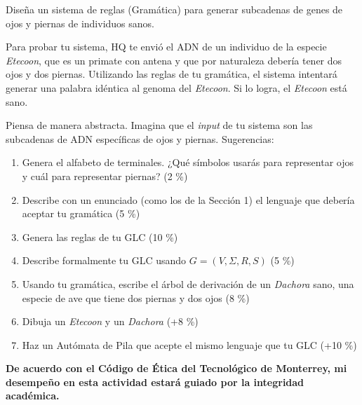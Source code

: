 \documentclass[8pt, onside]{article}
\begin{document}
Diseña un sistema de reglas (Gramática) para generar subcadenas de genes de ojos y piernas de individuos sanos.

Para probar tu sistema, HQ te envió el ADN de un individuo de la especie \textit{Etecoon}, que es un primate con antena y que por naturaleza debería tener dos ojos y dos piernas.
Utilizando las reglas de tu gramática, el sistema intentará generar una palabra idéntica al genoma del \textit{Etecoon}.
Si lo logra, el \textit{Etecoon} está sano.

Piensa de manera abstracta.
Imagina que el \textit{input} de tu sistema son las subcadenas de ADN específicas de ojos y piernas. Sugerencias:

\begin{enumerate}[label=\tt \alph*)]
    \item Genera el alfabeto de terminales. ¿Qué símbolos usarás para representar ojos y cuál para representar piernas? (2 \%)
    \item Describe con un enunciado (como los de la Sección 1) el lenguaje que debería aceptar tu gramática (5 \%)
    \item Genera las reglas de tu GLC (10 \%)
    \item Describe formalmente tu GLC usando $G = (V, \Sigma, R, S)$ (5 \%)
    \item Usando tu gramática, escribe el árbol de derivación de un \textit{Dachora} sano, una especie de ave que tiene dos piernas y dos ojos (8 \%)
    \item Dibuja un \textit{Etecoon} y un \textit{Dachora} (+8 \%)
    \item Haz un Autómata de Pila que acepte el mismo lenguaje que tu GLC (+10 \%)
\end{enumerate}

\vfill

\textbf{De acuerdo con el Código de Ética del Tecnológico de Monterrey, mi desempeño en esta actividad estará guiado por la integridad académica.}
\end{document}
